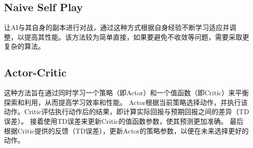 \documentclass{ctexart}
\begin{document}
\subsection{Naive Self Play}
让AI与其自身的副本进行对战，通过这种方式根据自身经验不断学习适应并调整，以提高其性能。该方法较为简单直接，如果要避免不收敛等问题，需要采取更复杂的算法。
\subsection{Actor-Critic}

这种方法旨在通过同时学习一个策略（即Actor）和一个值函数（即Critic）来平衡探索和利用，从而提高学习效率和性能。
Actor根据当前策略选择动作，并执行该动作。Critic评估执行动作后的结果，即计算实际回报与预期回报之间的差异（TD误差）。
接着使用TD误差来更新Critic的值函数参数，使其预测更加准确。
最后根据Critic提供的反馈（TD误差），更新Actor的策略参数，以便在未来选择更好的动作。
\end{document}
